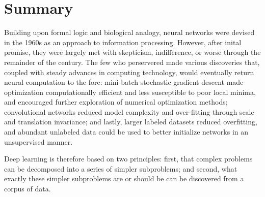 


\section{Summary}
\label{sec:summary}

Building upon formal logic and biological analogy, neural networks were devised in the 1960s as an approach to information processing.
However, after inital promise, they were largely met with skepticism, indifference, or worse through the remainder of the century.
The few who perservered made various discoveries that, coupled with steady advances in computing technology, would eventually return neural computation to the fore:
mini-batch stochastic gradient descent made optimization computationally efficient and less susceptible to poor local minima, and encouraged further exploration of numerical optimization methods;
convolutional networks reduced model complexity and over-fitting through scale and translation invariance;
and lastly, larger labeled datasets reduced overfitting, and abundant unlabeled data could be used to better initialize networks in an unsupervised manner.

Deep learning is therefore based on two principles: first, that complex problems can be decomposed into a series of simpler subproblems; and second, what exactly these simpler subproblems are or should be can be discovered from a corpus of data.
